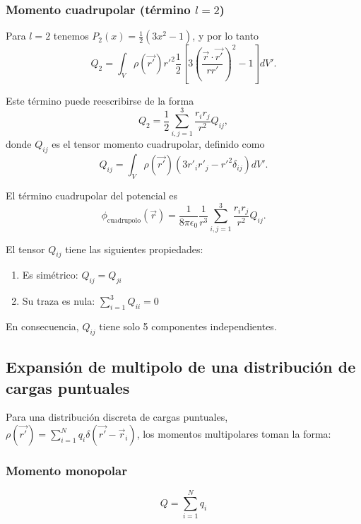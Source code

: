 \documentclass[12pt,a4paper]{book}
\begin{document}
\subsubsection{Momento cuadrupolar (término $l=2$)}

Para $l=2$ tenemos $P_2(x) = \frac{1}{2}(3x^2 - 1)$, y por lo tanto
\begin{equation}
Q_2 = \int_V \rho(\vec{r'})r'^2 \frac{1}{2}\left[3\left(\frac{\vec{r}\cdot\vec{r'}}{rr'}\right)^2 - 1\right] dV'.
\end{equation}

Este término puede reescribirse de la forma
\begin{equation}
Q_2 = \frac{1}{2}\sum_{i,j=1}^{3}\frac{r_i r_j}{r^2}Q_{ij},
\end{equation}
donde $Q_{ij}$ es el tensor momento cuadrupolar, definido como
\begin{equation}
Q_{ij} = \int_V \rho(\vec{r'})(3r'_i r'_j - r'^2\delta_{ij}) dV'.
\end{equation}

El término cuadrupolar del potencial es
\begin{equation}
\phi_{\text{cuadrupolo}}(\vec{r}) = \frac{1}{8\pi\epsilon_0}\frac{1}{r^3}\sum_{i,j=1}^{3}\frac{r_i r_j}{r^2}Q_{ij}.
\end{equation}

El tensor $Q_{ij}$ tiene las siguientes propiedades:
\begin{enumerate}
\item Es simétrico: $Q_{ij} = Q_{ji}$
\item Su traza es nula: $\sum_{i=1}^{3}Q_{ii} = 0$
\end{enumerate}

En consecuencia, $Q_{ij}$ tiene solo 5 componentes independientes.

\subsection{Expansión de multipolo de una distribución de cargas puntuales}

Para una distribución discreta de cargas puntuales, $\rho(\vec{r'}) = \sum_{i=1}^{N} q_i \delta(\vec{r'} - \vec{r}_i)$, los momentos multipolares toman la forma:

\subsubsection{Momento monopolar}
\begin{equation}
Q = \sum_{i=1}^{N} q_i
\end{equation}
\end{document}
